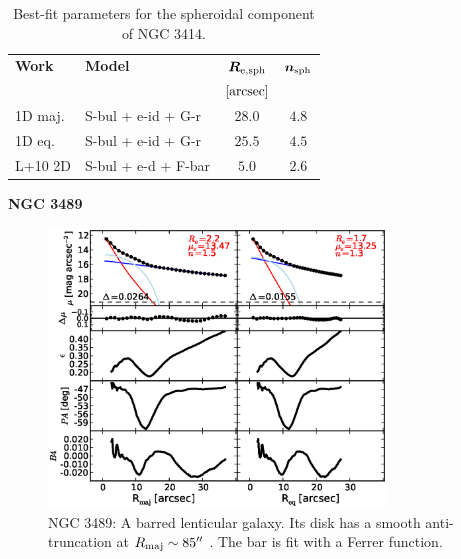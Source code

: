 \documentclass[preprint2]{emulateapj}
\newcommand{\fitfigurewidth}{0.8\textwidth}
\begin{document}
  \begin{table}[h]
  \small
  \caption{Best-fit parameters for the spheroidal component of NGC 3414.}
  \begin{center}
  \begin{tabular}{llcc}
  \hline
  {\bf Work} & {\bf Model}   & $\bm R_{\rm e,sph}$    & $\bm n_{\rm sph}$ \\
    &  &  $[\rm arcsec]$ & \\
  \hline
  1D maj. & S-bul + e-id + G-r & $28.0$  &  $4.8$ \\
  1D eq.  & S-bul + e-id + G-r & $25.5$  &  $4.5$ \\
  \hline
  L+10 2D         & S-bul + e-d + F-bar	  & $5.0$  &  $2.6$ \\
  \hline
  \end{tabular}
  \end{center}
  \label{tab:n3414}
  \end{table}


  \clearpage\newpage\noindent
  {\bf NGC 3489 \\}

  \begin{figure}[h]
  \begin{center}
  \includegraphics[width=\fitfigurewidth]{n3489_1Dfit.eps}
  \caption{NGC 3489: 
  A barred lenticular galaxy. 
  Its disk has a smooth anti-truncation at $R_{\rm maj} \sim 85''$ \citep{erwin2008}.
  The bar is fit with a Ferrer function.
  }
  \end{center}
  \end{figure}
\end{document}
